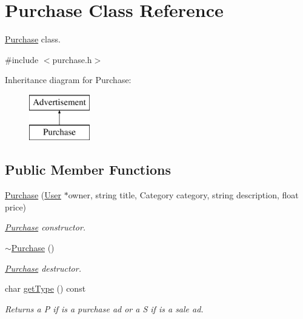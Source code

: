\hypertarget{class_purchase}{}\section{Purchase Class Reference}
\label{class_purchase}


\hyperlink{class_purchase}{Purchase} class.  




{\ttfamily \#include $<$purchase.\+h$>$}

Inheritance diagram for Purchase\+:\begin{figure}[H]
\begin{center}
\leavevmode
\includegraphics[height=2.000000cm]{class_purchase}
\end{center}
\end{figure}
\subsection*{Public Member Functions}
\begin{DoxyCompactItemize}
\item 
\hyperlink{class_purchase_ab7f299a547a1762433273500bc4085cf}{Purchase} (\hyperlink{class_user}{User} $\ast$owner, string title, Category category, string description, float price)
\begin{DoxyCompactList}\small\item\em \hyperlink{class_purchase}{Purchase} constructor. \end{DoxyCompactList}\item 
\hypertarget{class_purchase_a8ebd6efb2177df6d10fcba514095915f}{}\hyperlink{class_purchase_a8ebd6efb2177df6d10fcba514095915f}{$\sim$\+Purchase} ()\label{class_purchase_a8ebd6efb2177df6d10fcba514095915f}

\begin{DoxyCompactList}\small\item\em \hyperlink{class_purchase}{Purchase} destructor. \end{DoxyCompactList}\item 
char \hyperlink{class_purchase_aacd849fc1ec2b96e7c59de4012b8e45a}{get\+Type} () const 
\begin{DoxyCompactList}\small\item\em Returns a P if is a purchase ad or a S if is a sale ad. \end{DoxyCompactList}\end{DoxyCompactItemize}
